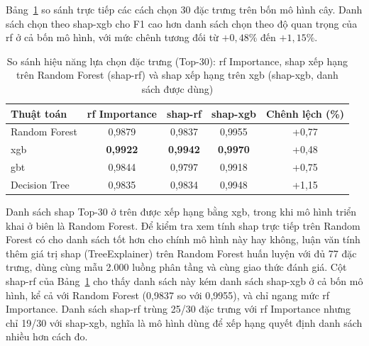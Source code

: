 Bảng~\ref{tab:rf_vs_shap} so sánh trực tiếp các cách chọn 30 đặc trưng trên bốn mô hình cây. Danh sách chọn theo \ac{shap}-\ac{xgb} cho F1 cao hơn danh sách chọn theo độ quan trọng của \ac{rf} ở cả bốn mô hình, với mức chênh tương đối từ $+0{,}48\%$ đến $+1{,}15\%$.

\begin{table}[htbp]
\centering
\caption[So sánh lựa chọn đặc trưng: RF Importance vs SHAP (Top-30)]{So sánh hiệu năng lựa chọn đặc trưng (Top-30): \ac{rf} Importance, \ac{shap} xếp hạng trên Random Forest (\ac{shap}-\ac{rf}) và \ac{shap} xếp hạng trên \ac{xgb} (\ac{shap}-\ac{xgb}, danh sách được dùng)}
\label{tab:rf_vs_shap}
\begin{tabular*}{\textwidth}{@{\extracolsep{\fill}}lcccc@{}}
\toprule
\textbf{Thuật toán} & \textbf{\ac{rf} Importance} & \textbf{\ac{shap}-\ac{rf}} & \textbf{\ac{shap}-\ac{xgb}} & \textbf{Chênh lệch (\%)} \\ \midrule
Random Forest & 0{,}9879 & 0{,}9837 & 0{,}9955 & +0{,}77 \\
\ac{xgb} & \textbf{0{,}9922} & \textbf{0{,}9942} & \textbf{0{,}9970} & +0{,}48 \\
\ac{gbt} & 0{,}9844 & 0{,}9797 & 0{,}9918 & +0{,}75 \\
Decision Tree & 0{,}9835 & 0{,}9834 & 0{,}9948 & +1{,}15 \\ \bottomrule
\end{tabular*}
\end{table}

Danh sách \ac{shap} Top-30 ở trên được xếp hạng bằng \ac{xgb}, trong khi mô hình triển khai ở biên là Random Forest. Để kiểm tra xem tính \ac{shap} trực tiếp trên Random Forest có cho danh sách tốt hơn cho chính mô hình này hay không, luận văn tính thêm giá trị \ac{shap} (TreeExplainer) trên Random Forest huấn luyện với đủ 77 đặc trưng, dùng cùng mẫu 2.000 luồng phân tầng và cùng giao thức đánh giá. Cột \ac{shap}-\ac{rf} của Bảng~\ref{tab:rf_vs_shap} cho thấy danh sách này kém danh sách \ac{shap}-\ac{xgb} ở cả bốn mô hình, kể cả với Random Forest (0{,}9837 so với 0{,}9955), và chỉ ngang mức \ac{rf} Importance. Danh sách \ac{shap}-\ac{rf} trùng 25/30 đặc trưng với \ac{rf} Importance nhưng chỉ 19/30 với \ac{shap}-\ac{xgb}, nghĩa là mô hình dùng để xếp hạng quyết định danh sách nhiều hơn cách đo.

